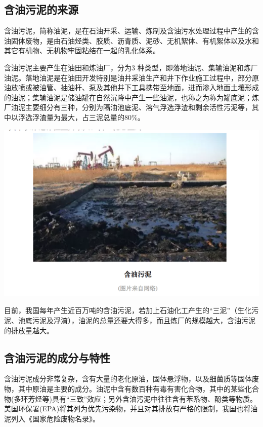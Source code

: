 \documentclass[
]{book}
\begin{document}
\hypertarget{ux542bux6cb9ux6c61ux6ce5ux7684ux6765ux6e90}{%
\subsection{含油污泥的来源}\label{ux542bux6cb9ux6c61ux6ce5ux7684ux6765ux6e90}}

含油污泥，简称油泥，是在石油开采、运输、炼制及含油污水处理过程中产生的含油固体废物，是由石油烃类、胶质、沥青质、泥砂、无机絮体、有机絮体以及水和其它有机物、无机物牢固粘结在一起的乳化体系。

含油污泥主要产生在油田和炼油厂，分为3 种类型，即落地油泥、集输油泥和炼厂油泥。落地油泥是在油田开发特别是油井采油生产和井下作业施工过程中，部分原油放喷或被油管、抽油杆、泵及其他井下工具携带至地面，进而渗入地面土壤形成的油泥；集输油泥是储油罐在自然沉降中产生一些油泥，也称之为称为罐底泥；炼厂油泥主要细分有三种，分别为隔油池底泥、溶气浮选浮渣和剩余活性污泥等，其中以浮选浮渣量为最大，占三泥总量的80\%。

\includegraphics[width=8.33in]{images/youni3}

目前，我国每年产生近百万吨的含油污泥，若加上石油化工产生的``三泥''（生化污泥、池底污泥及浮渣），油泥的总量还要大得多，而且炼厂的规模越大，含油污泥的排放量越大。

\hypertarget{ux542bux6cb9ux6c61ux6ce5ux7684ux6210ux5206ux4e0eux7279ux6027}{%
\subsection{含油污泥的成分与特性}\label{ux542bux6cb9ux6c61ux6ce5ux7684ux6210ux5206ux4e0eux7279ux6027}}

含油污泥成分非常复杂，含有大量的老化原油，固体悬浮物，以及细菌质等固体废物，其中原油是主要的成分。油泥中含有数百种有毒有害化合物，其中的某些化合物(多环芳烃等)具有``三致''效应；另外含油污泥中往往含有苯系物、酚类等物质。美国环保署(EPA)将其列为优先污染物，并且对其排放有严格的限制，我国也将油泥列入《国家危险废物名录》。
\end{document}

